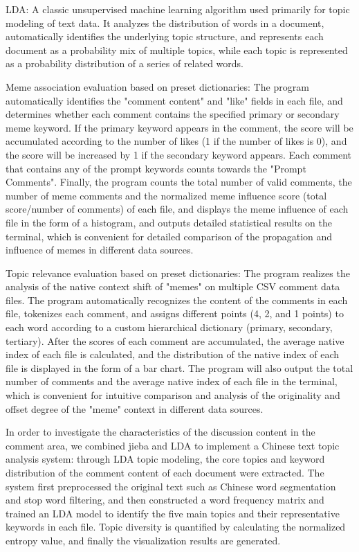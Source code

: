 \documentclass[12pt,a4paper]{ctexart}
\begin{document}
LDA: A classic unsupervised machine learning algorithm used primarily for topic modeling of text data. It analyzes the distribution of words in a document, automatically identifies the underlying topic structure, and represents each document as a probability mix of multiple topics, while each topic is represented as a probability distribution of a series of related words.

Meme association evaluation based on preset dictionaries: The program automatically identifies the "comment content" and "like" fields in each file, and determines whether each comment contains the specified primary or secondary meme keyword. If the primary keyword appears in the comment, the score will be accumulated according to the number of likes (1 if the number of likes is 0), and the score will be increased by 1 if the secondary keyword appears. Each comment that contains any of the prompt keywords counts towards the "Prompt Comments". Finally, the program counts the total number of valid comments, the number of meme comments and the normalized meme influence score (total score/number of comments) of each file, and displays the meme influence of each file in the form of a histogram, and outputs detailed statistical results on the terminal, which is convenient for detailed comparison of the propagation and influence of memes in different data sources.

Topic relevance evaluation based on preset dictionaries: The program realizes the analysis of the native context shift of "memes" on multiple CSV comment data files. The program automatically recognizes the content of the comments in each file, tokenizes each comment, and assigns different points (4, 2, and 1 points) to each word according to a custom hierarchical dictionary (primary, secondary, tertiary). After the scores of each comment are accumulated, the average native index of each file is calculated, and the distribution of the native index of each file is displayed in the form of a bar chart. The program will also output the total number of comments and the average native index of each file in the terminal, which is convenient for intuitive comparison and analysis of the originality and offset degree of the "meme" context in different data sources.

In order to investigate the characteristics of the discussion content in the comment area, we combined jieba and LDA to implement a Chinese text topic analysis system: through LDA topic modeling, the core topics and keyword distribution of the comment content of each document were extracted. The system first preprocessed the original text such as Chinese word segmentation and stop word filtering, and then constructed a word frequency matrix and trained an LDA model to identify the five main topics and their representative keywords in each file. Topic diversity is quantified by calculating the normalized entropy value, and finally the visualization results are generated.
\end{document}
